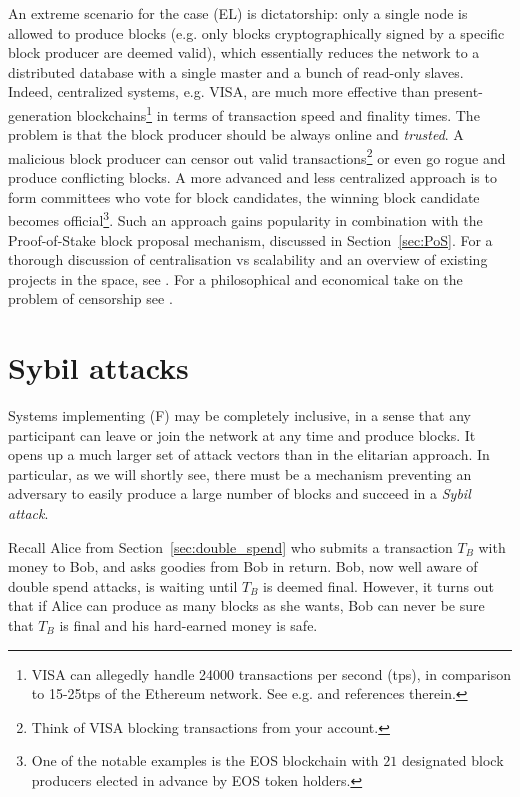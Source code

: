 \documentclass[a4paper]{article}
\begin{document}
An extreme scenario for the case (EL) is dictatorship: only a single node is allowed to produce blocks (e.g. only blocks cryptographically signed by a specific block producer are deemed valid), which essentially reduces the network to a distributed database with a single master and a bunch of read-only slaves. Indeed, centralized systems, e.g. VISA, are much more effective than present-generation blockchains\footnote{VISA can allegedly  handle 24000 transactions per second (tps), in comparison to 15-25tps of the Ethereum network. See e.g. \cite{tps} and references therein.} in terms of transaction speed and finality times. The problem is that the block producer should be always online and \emph{trusted}. A malicious block producer can censor out valid transactions\footnote{Think of VISA blocking transactions from your account.} or even go rogue and produce conflicting blocks. A more advanced and less centralized approach is to form committees who vote for block candidates, the winning block candidate becomes official\footnote{One of the notable examples is the EOS blockchain with $21$ designated block producers elected in advance by EOS token holders.  }. Such an approach gains popularity in combination with the Proof-of-Stake block proposal mechanism, discussed in Section~\ref{sec:PoS}. For a thorough discussion of centralisation vs scalability and an overview of existing projects in the space, see \cite{DLT}. For a philosophical and economical take on the problem of censorship see \cite{Censorship}.

\section{Sybil attacks} \label{sec:sybil}

   Systems implementing (F) may be completely inclusive, in a sense that any participant can leave or join the network at any time and produce blocks. It opens up a much larger set of attack vectors than in the elitarian approach. In particular, as we will shortly see, there must be a mechanism preventing an adversary to easily produce a large number of blocks and succeed in a \emph{Sybil attack}. 
   
   Recall Alice from Section~\ref{sec:double_spend} who submits a transaction $T_B$ with money to Bob, and asks goodies from Bob in return. Bob, now well aware of double spend attacks, is waiting until $T_B$ is deemed final. However, it turns out that if Alice can produce as many blocks as she wants, Bob can never be sure that $T_B$ is final and his hard-earned money is safe.
   
\end{document}
